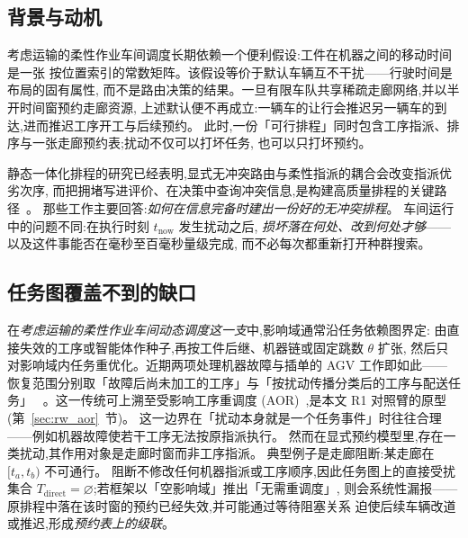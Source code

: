 \documentclass[manuscript,screen,review]{acmart}
\begin{document}
\subsection{背景与动机}

考虑运输的柔性作业车间调度长期依赖一个便利假设:工件在机器之间的移动时间是一张
按位置索引的常数矩阵。该假设等价于默认车辆互不干扰——行驶时间是布局的固有属性,
而不是路由决策的结果。一旦有限车队共享稀疏走廊网络,并以半开时间窗预约走廊资源,
上述默认便不再成立:一辆车的让行会推迟另一辆车的到达,进而推迟工序开工与后续预约。
此时,一份「可行排程」同时包含工序指派、排序与一张走廊预约表;扰动不仅可以打坏任务,
也可以只打坏预约。

静态一体化排程的研究已经表明,显式无冲突路由与柔性指派的耦合会改变指派优劣次序,
而把拥堵写进评价、在决策中查询冲突信息,是构建高质量排程的关键路径~\cite{vanos2026exact,li2026framework,sun2023integrated}。
那些工作主要回答:\emph{如何在信息完备时建出一份好的无冲突排程}。
车间运行中的问题不同:在执行时刻 \(t_{\mathrm{now}}\) 发生扰动之后,
\emph{损坏落在何处、改到何处才够}——以及这件事能否在毫秒至百毫秒量级完成,
而不必每次都重新打开种群搜索。

\subsection{任务图覆盖不到的缺口}

在\emph{考虑运输的柔性作业车间动态调度这一支}中,影响域通常沿任务依赖图界定:
由直接失效的工序或智能体作种子,再按工件后继、机器链或固定跳数 \(\theta\) 扩张,
然后只对影响域内任务重优化。近期两项处理机器故障与插单的 AGV 工作即如此——
恢复范围分别取「故障后尚未加工的工序」与「按扰动传播分类后的工序与配送任务」
~\cite{zhang2023energy,tang2026dynamic}。这一传统可上溯至受影响工序重调度
(AOR)~\cite{abumaizar1997rescheduling},是本文 R1 对照臂的原型
(第~\ref{sec:rw_aor}~节)。
这一边界在「扰动本身就是一个任务事件」时往往合理——例如机器故障使若干工序无法按原指派执行。
然而在显式预约模型里,存在一类扰动,其作用对象是走廊时窗而非工序指派。
典型例子是走廊阻断:某走廊在 \([t_a,t_b)\) 不可通行。
阻断不修改任何机器指派或工序顺序,因此任务图上的直接受扰集合
\(T_{\mathrm{direct}}=\varnothing\);若框架以「空影响域」推出「无需重调度」,
则会系统性漏报——原排程中落在该时窗的预约已经失效,并可能通过等待阻塞关系
迫使后续车辆改道或推迟,形成\emph{预约表上的级联}。
\end{document}
